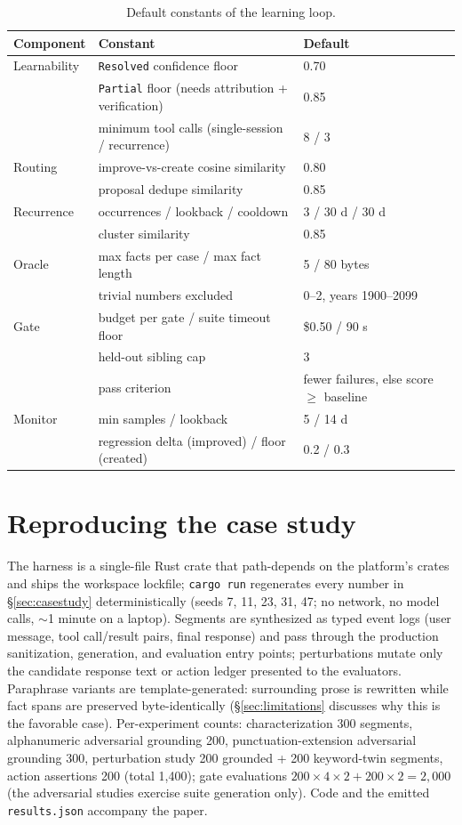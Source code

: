\documentclass{article}
\newcommand{\code}[1]{\texttt{\small #1}}
\begin{document}
\begin{table}[h]
\centering
\caption{Default constants of the learning loop.}
\label{tab:constants}
\footnotesize
\setlength{\tabcolsep}{4pt}
\begin{tabular}{lll}
\toprule
Component & Constant & Default \\
\midrule
Learnability & \code{Resolved} confidence floor & 0.70 \\
 & \code{Partial} floor (needs attribution + verification) & 0.85 \\
 & minimum tool calls (single-session / recurrence) & 8 / 3 \\
Routing & improve-vs-create cosine similarity & 0.80 \\
 & proposal dedupe similarity & 0.85 \\
Recurrence & occurrences / lookback / cooldown & 3 / 30 d / 30 d \\
 & cluster similarity & 0.85 \\
Oracle & max facts per case / max fact length & 5 / 80 bytes \\
 & trivial numbers excluded & 0--2, years 1900--2099 \\
Gate & budget per gate / suite timeout floor & \$0.50 / 90 s \\
 & held-out sibling cap & 3 \\
 & pass criterion & fewer failures, else score $\geq$ baseline \\
Monitor & min samples / lookback & 5 / 14 d \\
 & regression delta (improved) / floor (created) & 0.2 / 0.3 \\
\bottomrule
\end{tabular}
\end{table}

\section{Reproducing the case study}
\label{app:repro}

The harness is a single-file Rust crate that path-depends on the platform's crates and ships the workspace lockfile; \code{cargo run} regenerates every number in \S\ref{sec:casestudy} deterministically (seeds 7, 11, 23, 31, 47; no network, no model calls, $\sim$1 minute on a laptop). Segments are synthesized as typed event logs (user message, tool call/result pairs, final response) and pass through the production sanitization, generation, and evaluation entry points; perturbations mutate only the candidate response text or action ledger presented to the evaluators. Paraphrase variants are template-generated: surrounding prose is rewritten while fact spans are preserved byte-identically (\S\ref{sec:limitations} discusses why this is the favorable case). Per-experiment counts: characterization 300 segments, alphanumeric adversarial grounding 200, punctuation-extension adversarial grounding 300, perturbation study 200 grounded + 200 keyword-twin segments, action assertions 200 (total 1{,}400); gate evaluations $200 \times 4 \times 2 + 200 \times 2 = 2{,}000$ (the adversarial studies exercise suite generation only). Code and the emitted \code{results.json} accompany the paper.
\end{document}
